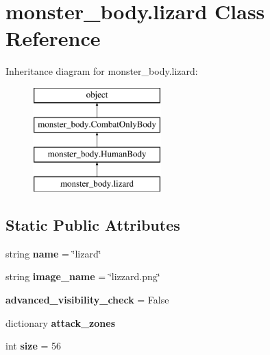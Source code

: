 \hypertarget{classmonster__body_1_1lizard}{}\section{monster\+\_\+body.\+lizard Class Reference}
\label{classmonster__body_1_1lizard}
Inheritance diagram for monster\+\_\+body.\+lizard\+:\begin{figure}[H]
\begin{center}
\leavevmode
\includegraphics[height=4.000000cm]{classmonster__body_1_1lizard}
\end{center}
\end{figure}
\subsection*{Static Public Attributes}
\begin{DoxyCompactItemize}
\item 
\hypertarget{classmonster__body_1_1lizard_aaf27b3179e104b0aa1726577166c1aaa}{}string {\bfseries name} = \char`\"{}lizard\char`\"{}\label{classmonster__body_1_1lizard_aaf27b3179e104b0aa1726577166c1aaa}

\item 
\hypertarget{classmonster__body_1_1lizard_a29b21387496a770f1964da8e56c9f426}{}string {\bfseries image\+\_\+name} = \char`\"{}lizzard.\+png\char`\"{}\label{classmonster__body_1_1lizard_a29b21387496a770f1964da8e56c9f426}

\item 
\hypertarget{classmonster__body_1_1lizard_a591cf47facb63abcbb21d52bd05f132e}{}{\bfseries advanced\+\_\+visibility\+\_\+check} = False\label{classmonster__body_1_1lizard_a591cf47facb63abcbb21d52bd05f132e}

\item 
dictionary {\bfseries attack\+\_\+zones}
\item 
\hypertarget{classmonster__body_1_1lizard_ab01e81a3969c86a54c6d251fa4335e40}{}int {\bfseries size} = 56\label{classmonster__body_1_1lizard_ab01e81a3969c86a54c6d251fa4335e40}

\end{DoxyCompactItemize}
